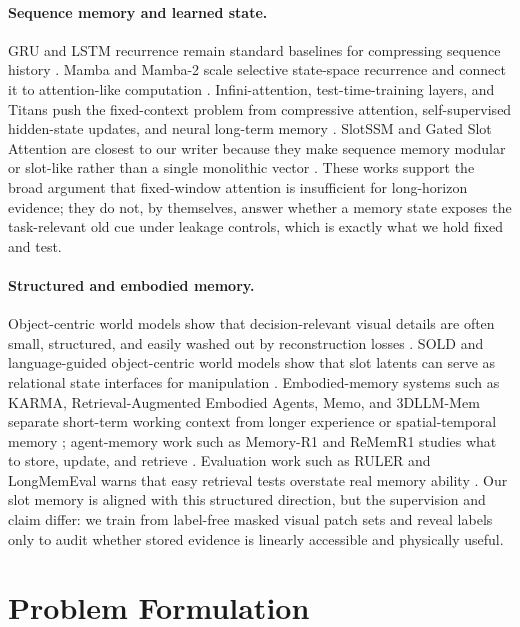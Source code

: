 \paragraph{Sequence memory and learned state.}
GRU and LSTM recurrence remain standard baselines for compressing sequence
history \citep{r_gru,r_lstm}.  Mamba and Mamba-2 scale selective state-space
recurrence and connect it to attention-like computation
\citep{r_mamba,r_mamba2}.  Infini-attention, test-time-training layers, and
Titans push the fixed-context problem from compressive attention, self-supervised
hidden-state updates, and neural long-term memory
\citep{r_infini_attention,r_ttt,r_titans}.  SlotSSM and Gated Slot Attention are
closest to our writer because they make sequence memory modular or slot-like
rather than a single monolithic vector \citep{r_slotssm,r_gsa}.  These works
support the broad argument that fixed-window attention is insufficient for
long-horizon evidence; they do not, by themselves, answer whether a memory state
exposes the task-relevant old cue under leakage controls, which is exactly what
we hold fixed and test.

\paragraph{Structured and embodied memory.}
Object-centric world models show that decision-relevant visual details are often
small, structured, and easily washed out by reconstruction losses
\citep{r_oc_storm}.  SOLD and language-guided object-centric world models show
that slot latents can serve as relational state interfaces for manipulation
\citep{r_sold,r_object_wm_lgm}.  Embodied-memory systems such as KARMA,
Retrieval-Augmented Embodied Agents, Memo, and 3DLLM-Mem separate short-term
working context from longer experience or spatial-temporal memory
\citep{r_karma,r_raea,r_memo,r_3dllm_mem}; agent-memory work such as Memory-R1
and ReMemR1 studies what to store, update, and retrieve
\citep{r_memory_r1,r_rememr1}.  Evaluation work such as RULER and LongMemEval
warns that easy retrieval tests overstate real memory ability
\citep{r_ruler,r_longmemeval}.  Our slot memory is aligned with this structured
direction, but the supervision and claim differ: we train from label-free masked
visual patch sets and reveal labels only to audit whether stored evidence is
linearly accessible and physically useful.

\section{Problem Formulation}

